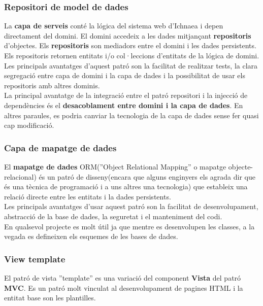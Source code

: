 \subsubsection{Repositori de model de dades}
La \textbf{capa de serveis} cont\'{e} la l\'{o}gica del sistema web d'Ichnaea i depen directament del domini. El domini accedeix a les dades mitjançant \textbf{repositoris} d'objectes. Els \textbf{repositoris} son mediadors entre el domini i les dades persistents. Els repositoris retornen entitats i/o col·leccions d'entitats de la l\'{ogica} de domini.\\

Les principals avantatges d'aquest patró son la facilitat de realitzar tests, la clara segregació entre capa de domini i la capa de dades i la possibilitat de usar els repositoris amb altres dominis.\\

La principal avantatge de la integració entre el patró repositori i la injecció de dependències \'{e}s el \textbf{desacoblament entre domini i la capa de dades}. En altres paraules, es podria canviar la tecnologia de la capa de dades sense fer quasi cap modificació. 

\label{ormdessign}
\subsubsection{Capa de mapatge de dades}
El \textbf{mapatge de dades} ORM(''Object Relational Mapping'' o mapatge objecte-relacional) \'{e}s un patr\'{o} de disseny(encara que alguns enginyers els agrada dir que \'{e}s una tècnica de programaci\'{o} i a uns altres una tecnologia) que estableix una relaci\'{o} directe entre les entitats i la dades persistents.\cite{orm}\\

Les principals avantatges d'usar aquest patró son la facilitat de desenvolupament, abstracció de la base de dades, la seguretat i el manteniment del codi.\\

En qualsevol projecte es molt útil ja que mentre es desenvolupen les classes, a la vegada es defineixen els esquemes de les bases de dades.

\subsubsection{View template}
El patró de vista ''template'' es una variació del component \textbf{Vista} del patró \textbf{MVC}. Es un patró molt vinculat al desenvolupament de pagines HTML i la entitat base son les plantilles.\\

